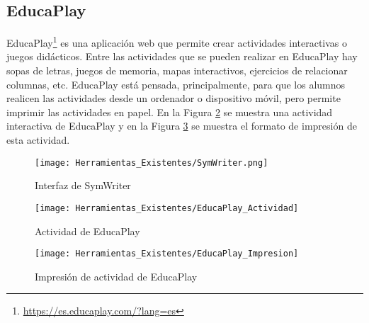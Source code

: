 \subsection{EducaPlay}
EducaPlay\footnote{\url{https://es.educaplay.com/?lang=es}} es una aplicación web que permite crear actividades interactivas o juegos didácticos. Entre las actividades que se pueden realizar en EducaPlay hay sopas de letras, juegos de memoria, mapas interactivos, ejercicios de relacionar columnas, etc. EducaPlay está pensada, principalmente, para que los alumnos realicen las actividades desde un ordenador o dispositivo móvil, pero permite imprimir las actividades en papel. En la Figura \ref{fig:EducaPlay_Actividad} se muestra una actividad interactiva de EducaPlay y en la Figura \ref{fig:EducaPlay_Impresion} se muestra el formato de impresión de esta actividad.


\begin{figure}[h!]
    \centering
    \texttt{[image: Herramientas\_Existentes/SymWriter.png]}
    \caption{Interfaz de SymWriter}
    \label{fig:SymWriter}
\end{figure}

\begin{figure}[h!]
    \centering
    \texttt{[image: Herramientas\_Existentes/EducaPlay\_Actividad]}
    \caption{Actividad de EducaPlay}
    \label{fig:EducaPlay_Actividad}
\end{figure}

\begin{figure}[h!]
    \centering
    \texttt{[image: Herramientas\_Existentes/EducaPlay\_Impresion]}
    \caption{Impresión de actividad de EducaPlay}
    \label{fig:EducaPlay_Impresion}
\end{figure}


